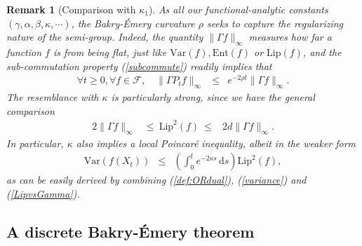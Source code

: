 \documentclass[12pt,final]{article}
\newtheorem{remark}{Remark}[section]
\newtheorem{example}{Example}[section]
\numberwithin{equation}{section}
\newcommand{\Lip}{\mathrm {Lip}}
\newcommand{\dR}{\mathbb {R}}
\newcommand{\Ent}{\mathrm{Ent}}
\newcommand{\Var}{\mathrm{Var}}
\newcommand{\dd}{\,\mathrm{d}}
\newcommand{\cF}{\mathcal {F}}
\newcommand{\dX}{\mathbb{X}}
\begin{document}
\begin{remark}[Comparison with $\kappa_1$]\label{rk:ORvsBE}As all our  functional-analytic constants $(\gamma,\alpha,\beta,\kappa,\cdots)$, the Bakry-\'Emery curvature $\rho$ seeks to capture the regularizing nature of the semi-group. Indeed, the quantity $\|\Gamma f\|_\infty$ measures how far a function $f$ is from being flat, just like $\Var(f),\Ent(f)$ or $\Lip(f)$, and the sub-commutation property (\ref{subcommute}) readily implies that
\begin{eqnarray}
\label{Gammadecay}
\forall t\ge 0,\forall f\in\cF,\quad \|\Gamma P_tf\|_\infty & \le & e^{-2\rho t} \|\Gamma f\|_\infty. 
\end{eqnarray}
The resemblance with  $\kappa$ is particularly strong, since we have the general comparison 
\begin{eqnarray}
\label{LipvsGamma}
2\|\Gamma f\|_\infty & \le \ \Lip^2(f) \ \le &  2d\|\Gamma f\|_\infty.
\end{eqnarray}
In particular, $\kappa$ also implies a local Poincaré inequality, albeit in the  weaker form
\begin{eqnarray}
\Var(f(X_t)) & \le & \left(\int_0^t e^{-2\kappa s}\dd s\right)\Lip^2(f),
\end{eqnarray}
as can be easily derived by combining (\ref{def:ORdual}), (\ref{variance}) and  (\ref{LipvsGamma}).
\end{remark}

\subsection{A discrete Bakry-\'Emery theorem}
\end{document}
